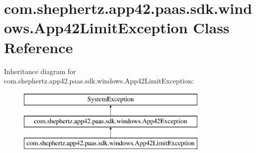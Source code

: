 \hypertarget{classcom_1_1shephertz_1_1app42_1_1paas_1_1sdk_1_1windows_1_1_app42_limit_exception}{\section{com.\+shephertz.\+app42.\+paas.\+sdk.\+windows.\+App42\+Limit\+Exception Class Reference}
\label{classcom_1_1shephertz_1_1app42_1_1paas_1_1sdk_1_1windows_1_1_app42_limit_exception}
}
Inheritance diagram for com.\+shephertz.\+app42.\+paas.\+sdk.\+windows.\+App42\+Limit\+Exception\+:\begin{figure}[H]
\begin{center}
\leavevmode
\includegraphics[height=3.000000cm]{classcom_1_1shephertz_1_1app42_1_1paas_1_1sdk_1_1windows_1_1_app42_limit_exception}
\end{center}
\end{figure}
